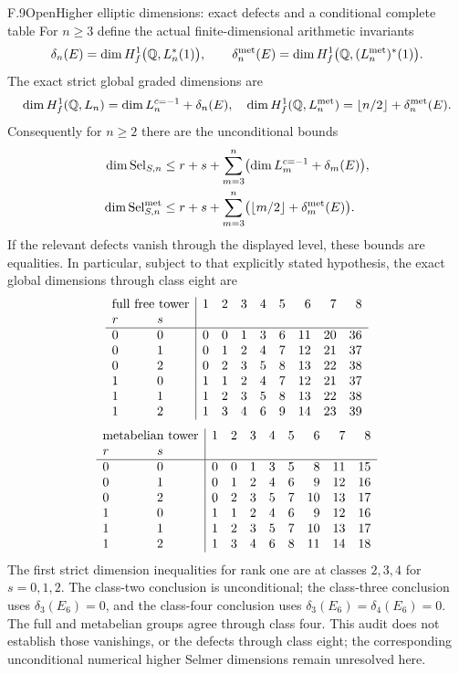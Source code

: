 \begin{statement}{F.9}{Open}{Higher elliptic dimensions: exact defects and a conditional complete table}
For $n\ge3$ define the actual finite-dimensional arithmetic invariants
\[
 \delta_n(E)=\dim H_f^1\bigl(\mathbb Q,L_n^*(1)\bigr),\qquad
 \delta_n^{\rm met}(E)=
       \dim H_f^1\bigl(\mathbb Q,(L_n^{\rm met})^*(1)\bigr).
\]
The exact strict global graded dimensions are
\[
 \dim H_f^1(\mathbb Q,L_n)=\dim L_n^{c=-1}+\delta_n(E),
 \quad
 \dim H_f^1(\mathbb Q,L_n^{\rm met})
       =\lfloor n/2\rfloor+\delta_n^{\rm met}(E).
\]
Consequently for $n\ge2$ there are the unconditional bounds
\[
 \begin{split}
 \dim\operatorname{Sel}_{S,n}
   &\le r+s+\sum_{m=3}^n\bigl(\dim L_m^{c=-1}+\delta_m(E)\bigr),\\
 \dim\operatorname{Sel}^{\rm met}_{S,n}
   &\le r+s+\sum_{m=3}^n
           \bigl(\lfloor m/2\rfloor+\delta_m^{\rm met}(E)\bigr).
 \end{split}
\]
If the relevant defects vanish through the displayed level, these
bounds are equalities. In particular, subject to that explicitly
stated hypothesis, the exact global dimensions through class eight are
\[
\begin{array}{cc|rrrrrrrr}
 \multicolumn{2}{c|}{\text{full free tower}}&1&2&3&4&5&6&7&8\\
 r&s&&&&&&&&\\\hline
 0&0&0&0&1&3&6&11&20&36\\
 0&1&0&1&2&4&7&12&21&37\\
 0&2&0&2&3&5&8&13&22&38\\
 1&0&1&1&2&4&7&12&21&37\\
 1&1&1&2&3&5&8&13&22&38\\
 1&2&1&3&4&6&9&14&23&39
\end{array}
\]
\[
\begin{array}{cc|rrrrrrrr}
 \multicolumn{2}{c|}{\text{metabelian tower}}&1&2&3&4&5&6&7&8\\
 r&s&&&&&&&&\\\hline
 0&0&0&0&1&3&5&8&11&15\\
 0&1&0&1&2&4&6&9&12&16\\
 0&2&0&2&3&5&7&10&13&17\\
 1&0&1&1&2&4&6&9&12&16\\
 1&1&1&2&3&5&7&10&13&17\\
 1&2&1&3&4&6&8&11&14&18
\end{array}
\]
The first strict dimension inequalities for rank one are at classes
$2,3,4$ for $s=0,1,2$. The class-two conclusion is unconditional;
the class-three conclusion uses $\delta_3(E_6)=0$, and the class-four
conclusion uses $\delta_3(E_6)=\delta_4(E_6)=0$. The full and metabelian
groups agree through class four. This audit does not establish those
vanishings, or the defects through class eight; the corresponding
unconditional numerical higher Selmer dimensions remain unresolved here.
\end{statement}
